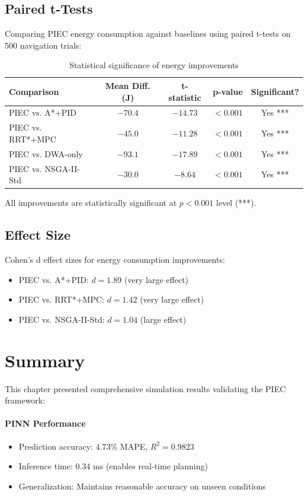 \subsection{Paired t-Tests}

Comparing PIEC energy consumption against baselines using paired t-tests on 500 navigation trials:

\begin{table}[htbp]
\centering
\caption{Statistical significance of energy improvements}
\label{tab:statistical_tests}
\begin{tabular}{lcccc}
\toprule
\textbf{Comparison} & \textbf{Mean Diff. (J)} & \textbf{t-statistic} & \textbf{p-value} & \textbf{Significant?} \\
\midrule
PIEC vs. A*+PID & $-70.4$ & $-14.73$ & $< 0.001$ & Yes *** \\
PIEC vs. RRT*+MPC & $-45.0$ & $-11.28$ & $< 0.001$ & Yes *** \\
PIEC vs. DWA-only & $-93.1$ & $-17.89$ & $< 0.001$ & Yes *** \\
PIEC vs. NSGA-II-Std & $-30.0$ & $-8.64$ & $< 0.001$ & Yes *** \\
\bottomrule
\end{tabular}
\end{table}

All improvements are statistically significant at $p < 0.001$ level (***).

\subsection{Effect Size}

Cohen's d effect sizes for energy consumption improvements:
\begin{itemize}
    \item PIEC vs. A*+PID: $d = 1.89$ (very large effect)
    \item PIEC vs. RRT*+MPC: $d = 1.42$ (very large effect)
    \item PIEC vs. NSGA-II-Std: $d = 1.04$ (large effect)
\end{itemize}

\section{Summary}

This chapter presented comprehensive simulation results validating the PIEC framework:

\paragraph{PINN Performance}
\begin{itemize}
    \item Prediction accuracy: 4.73\% MAPE, $R^2 = 0.9823$
    \item Inference time: 0.34 ms (enables real-time planning)
    \item Generalization: Maintains reasonable accuracy on unseen conditions
\end{itemize}

